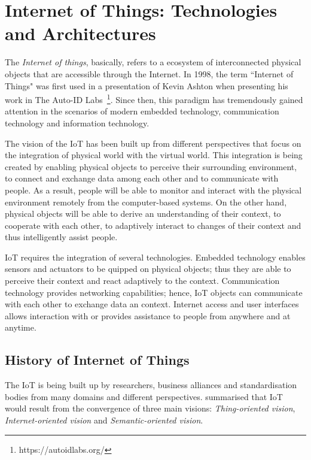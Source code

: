 \chapter{Internet of Things: Technologies and Architectures}
\label{ch:iot_tech_arch}

The \textit{Internet of things}, basically, refers to a ecosystem of interconnected physical objects that are accessible through the Internet. 
In 1998, the term ``Internet of Things" was first used in a presentation of Kevin Ashton when presenting his work in The Auto-ID Labs~\footnote{https://autoidlabs.org/}. 
Since then, this paradigm has tremendously gained attention in the scenarios of modern embedded technology, communication technology and information technology.

The vision of the IoT has been built up from different perspectives that focus on the integration of physical world with the virtual world.
This integration is being created by enabling physical objects to perceive their surrounding environment, to connect and exchange data among each other and to communicate with people.
As a result, people will be able to monitor and interact with the physical environment remotely from the computer-based systems.
On the other hand, physical objects will be able to derive an understanding of their context, to cooperate with each other, to adaptively interact to changes of their context and thus intelligently assist people.

IoT requires the integration of several technologies.
Embedded technology enables sensors and actuators to be quipped on physical objects; thus they are able to perceive their context and react adaptively to the context.
Communication technology provides networking capabilities; hence, IoT objects can communicate with each other to exchange data an context.
Internet access and user interfaces allows interaction with or provides assistance to people from anywhere and at anytime.

\section{History of Internet of Things}
\label{sec:history_of_iot}
The IoT is being built up by researchers, business alliances and standardisation bodies from many domains and different perspectives.
\cite{Atzori:2010} summarised that IoT would result from the convergence of three main visions: \textit{Thing-oriented vision}, \textit{Internet-oriented vision} and \textit{Semantic-oriented vision}.

